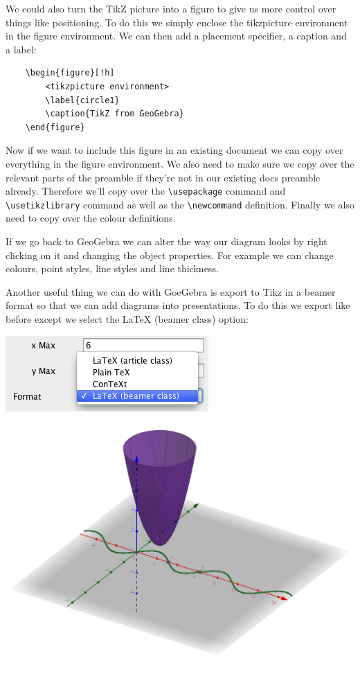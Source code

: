 \documentclass[cn,11pt, simple]{elegantbook}
\begin{document}

We could also turn the TikZ picture into a figure to give us more control over things like positioning. To do this we simply enclose the tikzpicture environment in the figure environment. We can then add a placement specifier, a caption and a label:

\begin{lstlisting}
	\begin{figure}[!h]
		<tikzpicture environment>
		\label{circle1}
		\caption{TikZ from GeoGebra}
	\end{figure}
\end{lstlisting}

Now if we want to include this figure in an existing document we can copy over everything in the figure environment. We also need to make sure we copy over the relevant parts of the preamble if they're not in our existing docs preamble already. Therefore we'll copy over the \verb|\usepackage| command and \verb|\usetikzlibrary| command as well as the \verb|\newcommand| definition. Finally we also need to copy over the colour definitions.

If we go back to GeoGebra we can alter the way our diagram looks by right clicking on it and changing the object properties. For example we can change colours, point styles, line styles and line thickness.


Another useful thing we can do with GoeGebra is export to Tikz in a beamer format so that we can add diagrams into presentations. To do this we export like before except we select the LaTeX (beamer class) option:

\centerline{\includegraphics[scale=1]{Tikzfig10.png}}




\centerline{\includegraphics[scale=0.5]{geogebra1.png}}
\end{document}
